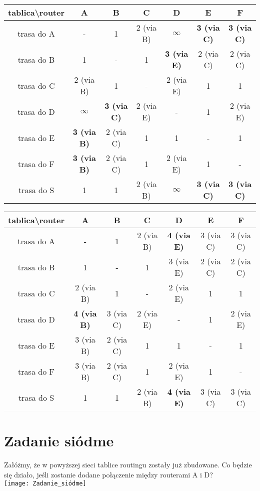 \documentclass[a4paper]{article}
\begin{document}
\begin{center}
\begin{tabular}{ |c|c|c|c|c|c|c| } 
 \hline
 tablica\textbackslash router & A & B & C & D & E & F \\ 
 \hline
 trasa do A & - & 1 & 2 (via B) & $\infty$ & \textbf{3 (via C)} & \textbf{3 (via C)}  \\ 
 \hline
 trasa do B & 1 & - & 1 & \textbf{3 (via E)} & 2 (via C) & 2 (via C) \\ 
 \hline
 trasa do C & 2 (via B) & 1 & - & 2 (via E) & 1 & 1 \\ 
 \hline
 trasa do D & $\infty$ & \textbf{3 (via C)} & 2 (via E) & - & 1 & 2 (via E) \\ 
 \hline
 trasa do E & \textbf{3 (via B)} & 2 (via C) & 1 & 1 & - & 1 \\ 
 \hline
 trasa do F & \textbf{3 (via B)} & 2 (via C) & 1 & 2 (via E) & 1 & - \\ 
 \hline
 trasa do S & 1 & 1 & 2 (via B) & $\infty$ & \textbf{3 (via C)} & \textbf{3 (via C)} \\ 
 \hline
\end{tabular}
\end{center}

\begin{center}
\begin{tabular}{ |c|c|c|c|c|c|c| } 
 \hline
 tablica\textbackslash router & A & B & C & D & E & F \\ 
 \hline
 trasa do A & - & 1 & 2 (via B) & \textbf{4 (via E)} & 3 (via C) & 3 (via C)  \\ 
 \hline
 trasa do B & 1 & - & 1 & 3 (via E) & 2 (via C) & 2 (via C) \\ 
 \hline
 trasa do C & 2 (via B) & 1 & - & 2 (via E) & 1 & 1 \\ 
 \hline
 trasa do D & \textbf{4 (via B)} & 3 (via C) & 2 (via E) & - & 1 & 2 (via E) \\ 
 \hline
 trasa do E & 3 (via B) & 2 (via C) & 1 & 1 & - & 1 \\ 
 \hline
 trasa do F & 3 (via B) & 2 (via C) & 1 & 2 (via E) & 1 & - \\ 
 \hline
 trasa do S & 1 & 1 & 2 (via B) & \textbf{4 (via E)} & 3 (via C) & 3 (via C) \\ 
 \hline
\end{tabular}
\end{center}


\section{Zadanie siódme}
Załóżmy, że w powyższej sieci tablice routingu zostały już zbudowane. Co będzie się działo, jeśli zostanie dodane połączenie między routerami A i D?\\
\texttt{[image: Zadanie\_siódme]}
\end{document}

